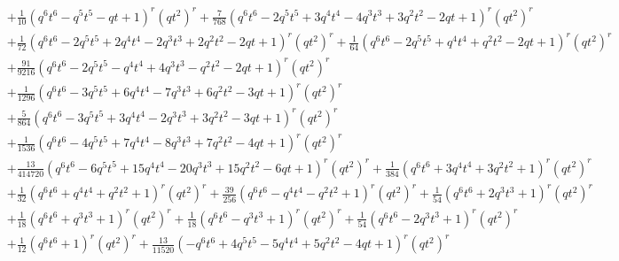 \documentclass[11pt,english]{amsart}
\numberwithin{equation}{section}
\numberwithin{figure}{section}
\theoremstyle{plain}
\theoremstyle{plain}
\theoremstyle{definition}
\theoremstyle{remark}
\begin{document}
{\begin{align*}
& + \frac{1}{10}  {\left(q^{6} t^{6} - q^{5} t^{5} - q t + 1\right)}^{r} \left(q t^{2}\right)^{r} + \frac{7}{768}  {\left(q^{6} t^{6} - 2  q^{5} t^{5} + 3  q^{4} t^{4} - 4  q^{3} t^{3} + 3  q^{2} t^{2} - 2  q t + 1\right)}^{r} \left(q t^{2}\right)^{r} \\
& + \frac{1}{72}  {\left(q^{6} t^{6} - 2  q^{5} t^{5} + 2  q^{4} t^{4} - 2  q^{3} t^{3} + 2  q^{2} t^{2} - 2  q t + 1\right)}^{r} \left(q t^{2}\right)^{r} + \frac{1}{64}  {\left(q^{6} t^{6} - 2  q^{5} t^{5} + q^{4} t^{4} + q^{2} t^{2} - 2  q t + 1\right)}^{r} \left(q t^{2}\right)^{r} \\
& + \frac{91}{9216}  {\left(q^{6} t^{6} - 2  q^{5} t^{5} - q^{4} t^{4} + 4  q^{3} t^{3} - q^{2} t^{2} - 2  q t + 1\right)}^{r} \left(q t^{2}\right)^{r} \\
& + \frac{1}{1296}  {\left(q^{6} t^{6} - 3  q^{5} t^{5} + 6  q^{4} t^{4} - 7  q^{3} t^{3} + 6  q^{2} t^{2} - 3  q t + 1\right)}^{r} \left(q t^{2}\right)^{r} \\
& + \frac{5}{864}  {\left(q^{6} t^{6} - 3  q^{5} t^{5} + 3  q^{4} t^{4} - 2  q^{3} t^{3} + 3  q^{2} t^{2} - 3  q t + 1\right)}^{r} \left(q t^{2}\right)^{r} \\
& + \frac{1}{1536}  {\left(q^{6} t^{6} - 4  q^{5} t^{5} + 7  q^{4} t^{4} - 8  q^{3} t^{3} + 7  q^{2} t^{2} - 4  q t + 1\right)}^{r} \left(q t^{2}\right)^{r} \\
& + \frac{13}{414720}  {\left(q^{6} t^{6} - 6  q^{5} t^{5} + 15  q^{4} t^{4} - 20  q^{3} t^{3} + 15  q^{2} t^{2} - 6  q t + 1\right)}^{r} \left(q t^{2}\right)^{r} + \frac{1}{384}  {\left(q^{6} t^{6} + 3  q^{4} t^{4} + 3  q^{2} t^{2} + 1\right)}^{r} \left(q t^{2}\right)^{r} \\
& + \frac{1}{32}  {\left(q^{6} t^{6} + q^{4} t^{4} + q^{2} t^{2} + 1\right)}^{r} \left(q t^{2}\right)^{r} + \frac{39}{256}  {\left(q^{6} t^{6} - q^{4} t^{4} - q^{2} t^{2} + 1\right)}^{r} \left(q t^{2}\right)^{r} + \frac{1}{54}  {\left(q^{6} t^{6} + 2  q^{3} t^{3} + 1\right)}^{r} \left(q t^{2}\right)^{r} \\
& + \frac{1}{18}  {\left(q^{6} t^{6} + q^{3} t^{3} + 1\right)}^{r} \left(q t^{2}\right)^{r} + \frac{1}{18}  {\left(q^{6} t^{6} - q^{3} t^{3} + 1\right)}^{r} \left(q t^{2}\right)^{r} + \frac{1}{54}  {\left(q^{6} t^{6} - 2  q^{3} t^{3} + 1\right)}^{r} \left(q t^{2}\right)^{r} \\
& + \frac{1}{12}  {\left(q^{6} t^{6} + 1\right)}^{r} \left(q t^{2}\right)^{r} + \frac{13}{11520}  {\left(-q^{6} t^{6} + 4  q^{5} t^{5} - 5  q^{4} t^{4} + 5  q^{2} t^{2} - 4  q t + 1\right)}^{r} \left(q t^{2}\right)^{r} \\

\end{align*}}
\end{document}
